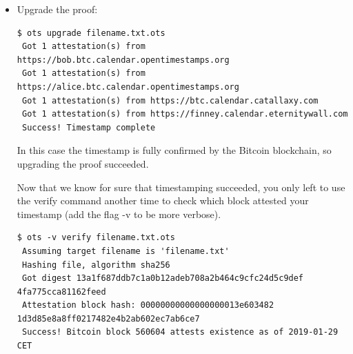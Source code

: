 \begin{itemize}
\begin{lstlisting}[breakatwhitespace=true]
\end{lstlisting}
Incomplete timestamps can be upgraded using the \colorbox{light-gray}{upgrade} command which adds the path to the relative block header merkleroot to the proof. Upgrading a proof isn't always available: there must be at least one completed attestation\footnote{That is, at least one of the four public calendars in question must have received an attestation from the Bitcoin blockchain.}.
\item Upgrade the proof: \bigskip
\begin{lstlisting}[breakatwhitespace=true]
 $ ots upgrade filename.txt.ots 
 Got 1 attestation(s) from https://bob.btc.calendar.opentimestamps.org
 Got 1 attestation(s) from https://alice.btc.calendar.opentimestamps.org
 Got 1 attestation(s) from https://btc.calendar.catallaxy.com
 Got 1 attestation(s) from https://finney.calendar.eternitywall.com
 Success! Timestamp complete
\end{lstlisting}
In this case the timestamp is fully confirmed by the Bitcoin blockchain, so upgrading the proof succeeded.

\bigskip
\noindent
Now that we know for sure that timestamping succeeded, you only left to use the \colorbox{light-gray}{verify} command another time to check which block attested your timestamp (add the flag \colorbox{light-gray}{-v} to be more verbose).\bigskip
\begin{lstlisting}[breakatwhitespace=true]
 $ ots -v verify filename.txt.ots
 Assuming target filename is 'filename.txt'
 Hashing file, algorithm sha256
 Got digest 13a1f687ddb7c1a0b12adeb708a2b464c9cfc24d5c9def 4fa775cca81162feed
 Attestation block hash: 00000000000000000013e603482 1d3d85e8a8ff0217482e4b2ab602ec7ab6ce7
 Success! Bitcoin block 560604 attests existence as of 2019-01-29 CET
\end{lstlisting}
\end{itemize}



